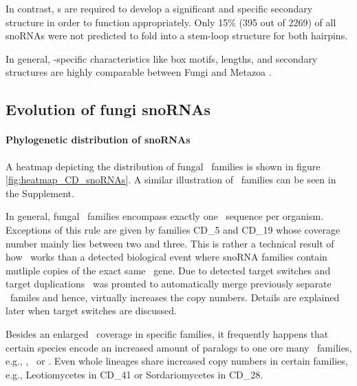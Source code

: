 In contrast, \haca s are required to develop a significant and specific secondary structure in order to function appropriately. Only 15\% (395 out of 2269) of all snoRNAs were not predicted to fold into a stem-loop structure for both hairpins. 

In general, \sno -specific characteristics like box motifs, lengths,
and secondary structures are highly comparable between Fungi and
Metazoa \cite{Kehr:2014}. 


\subsection{Evolution of fungi snoRNAs}
  
\paragraph{\textbf{Phylogenetic distribution of snoRNAs}}
A heatmap depicting the distribution of  fungal \cd\ families is shown
in figure \ref{fig:heatmap_CD_snoRNAs}. A similar illustration of \haca\
families can be seen in the Supplement. 

In general, fungal \sno\ families encompass exactly one \sno\ sequence
per organism. Exceptions of this rule are given by 
families CD\_5 and CD\_19 whose coverage number mainly lies between two and
three. This is rather a technical result of how \snostrip\ works than a
detected biological event where snoRNA families contain mutliple
copies of the exact same \sno\ gene. Due to detected target
switches and target duplications \snostrip\ was promted to
automatically merge previously separate \sno\ familes and hence,
virtually increases the copy numbers. Details are explained
later when target switches are discussed. 

Besides an enlarged
\sno\ coverage in specific families, it frequently happens that
certain species encode an increased amount of paralogs to one ore
many \sno\ families, e.g., \Ppl, \Asp\ or \Nfu. Even
whole lineages share increased copy numbers in certain families, e.g., 
Leotiomycetes in CD\_41 or Sordariomycetes in CD\_28.

